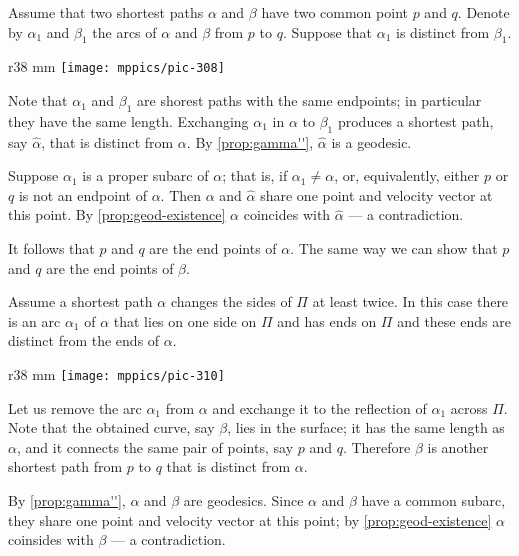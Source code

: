 Assume that two shortest paths $\alpha$ and $\beta$ have two common point $p$ and $q$.
Denote by $\alpha_1$ and $\beta_1$ the arcs of
$\alpha$ and $\beta$ from $p$ to $q$.
Suppose that $\alpha_1$ is distinct from $\beta_1$.

\begin{wrapfigure}{r}{38 mm}
\vskip-0mm
\centering
\texttt{[image: mppics/pic-308]}
\vskip0mm
\end{wrapfigure}

Note that $\alpha_1$ and $\beta_1$ are shorest paths with the same endpoints;
in particular they have the same length.
Exchanging $\alpha_1$ in $\alpha$ to $\beta_1$ produces a shortest path, say $\hat\alpha$, that is distinct from $\alpha$.
By \ref{prop:gamma''}, $\hat\alpha$ is a geodesic.

Suppose $\alpha_1$ is a proper subarc of $\alpha$;
that is, if $\alpha_1\ne\alpha$, or, equivalently, either $p$ or $q$ is not an endpoint of $\alpha$.
Then $\alpha$ and $\hat\alpha$ share one point and velocity vector at this point.
By \ref{prop:geod-existence} $\alpha$ coincides with $\hat\alpha$ --- a contradiction.

It follows that $p$ and $q$ are the end points of $\alpha$.
The same way we can show that $p$ and $q$ are the end points of $\beta$.

Assume a shortest path $\alpha$ changes the sides of $\Pi$ at least twice.
In this case there is an arc $\alpha_1$ of $\alpha$ that lies on one side on $\Pi$ and has ends on $\Pi$ and these ends are distinct from the ends of $\alpha$.

\begin{wrapfigure}{r}{38 mm}
\vskip-0mm
\centering
\texttt{[image: mppics/pic-310]}
\vskip0mm
\end{wrapfigure}

Let us remove the arc $\alpha_1$ from $\alpha$ and exchange it to the reflection of $\alpha_1$ across $\Pi$.
Note that the obtained curve, say $\beta$, lies in the surface; it has the same length as $\alpha$, and it connects the same pair of points, say $p$ and $q$.
Therefore $\beta$ is another shortest path from $p$ to $q$ that is distinct from $\alpha$.

By \ref{prop:gamma''}, $\alpha$ and $\beta$ are geodesics.
Since $\alpha$ and $\beta$ have a common subarc, they share one point and velocity vector at this point;
by \ref{prop:geod-existence} $\alpha$ coinsides with $\beta$ --- a contradiction.



